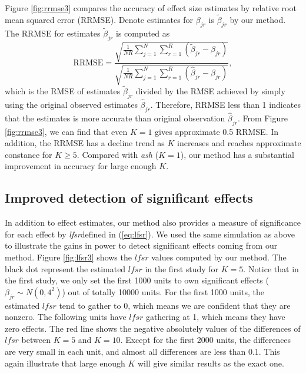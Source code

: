 \documentclass[12pt]{article}
\def\lfsr{\textit{lfsr}}
\begin{document}
\vspace{4mm}\noindent Figure \ref{fig:rrmse3} compares the accuracy of effect size estimates by relative root mean squared error (RRMSE). Denote estimates for $\beta_{jr}$ is $\tilde\beta_{jr}$ by our method. The RRMSE for estimates $\tilde\beta_{jr}$ is computed as 
\begin{equation}
\textrm{RRMSE} = \frac{\sqrt{\frac{1}{NR}\sum_{j=1}^N\sum_{r=1}^R(\tilde\beta_{jr}-\beta_{jr})}}{\sqrt{\frac{1}{NR}\sum_{j=1}^N\sum_{r=1}^R(\hat\beta_{jr}-\beta_{jr})}}, 
\end{equation}
which is the RMSE of estimates $\tilde\beta_{jr}$ divided by the RMSE achieved by simply using the original observed estimates $\hat\beta_{jr}$. Therefore, RRMSE less than 1 indicates that the estimates is more accurate than original observation  $\hat\beta_{jr}$. From Figure \ref{fig:rrmse3}, we can find that even $K=1$ gives approximate 0.5 RRMSE. In addition, the RRMSE has a decline trend as $K$ increases and reaches approximate constance for $K\geq 5$. Compared with \emph{ash} ($K=1$), our method has a substantial improvement in accuracy for large enough $K$. 

\vspace{5mm}
\subsection{Improved detection of significant effects}

\vspace{4mm} In addition to effect estimates, our method also provides a measure of significance for each effect by \lfsr defined in (\ref{eq:lfsr}). We used the same simulation as above to illustrate the gains in power to detect significant effects coming from our method. Figure \ref{fig:lfsr3} shows the $\lfsr$ values computed by our method. The black dot represent the estimated $\lfsr$ in the first study for $K=5$. Notice that in the first study, we only set the first 1000 units to own significant effects ($\beta_{jr}\sim N(0,4^2)$) out of totally 10000 units. For the first 1000 units, the estimated $\lfsr$ tend to gather to 0, which means we are confident that they are nonzero. The following units have $\lfsr$ gathering at 1, which means they have zero effects. The red line shows the negative absolutely values of the differences of $\lfsr$ between $K=5$ and $K=10$. Except for the first 2000 units, the differences are very small in each unit, and almost all differences are less than 0.1. This again illustrate that large enough $K$ will give similar results as the exact one. 
\end{document}
